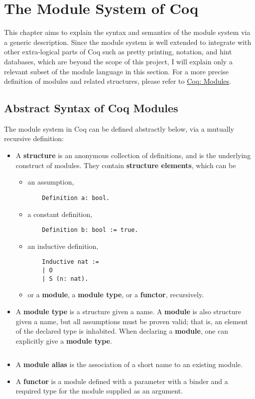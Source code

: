 \chapter{The Module System of Coq}

This chapter aims to explain the syntax and semantics of the module system via
a generic description. Since the module system is well extended to integrate
with other extra-logical parts of Coq such as pretty printing, notation, and 
hint databases, which are beyond the scope of this project, I will
explain only a relevant subset of the module language in this section.
For a more precise definition of modules and related structures, please refer to
\href{https://coq.inria.fr/refman/language/core/modules.html}{Coq: Modules}.

\section{Abstract Syntax of Coq Modules}
The module system in Coq can be defined abstractly below, via a mutually
recursive definition:
\begin{itemize}
\item A \textbf{structure} is an anonymous collection of definitions, and is the 
    underlying construct of modules. They contain \textbf{structure elements},
    which can be
    \begin{itemize}
    \item an assumption,
    \begin{verbatim}
    Definition a: bool.
    \end{verbatim}
    \item a constant definition,
    \begin{verbatim}
    Definition b: bool := true.
    \end{verbatim}
    \item an inductive definition,
    \begin{verbatim}
    Inductive nat :=
    | O
    | S (n: nat).
    \end{verbatim}
    \item or a \textbf{module}, a \textbf{module type}, or a \textbf{functor}, recursively.
    \end{itemize}

\item
    A \textbf{module type} is a structure given a name.
    A \textbf{module} is also structure given a name, but all assumptions must
      be proven valid; that is, an element of the declared type is inhabited.
    When declaring a \textbf{module}, one can explicitly give a \textbf{module type}.
    \inputminted[firstline=11,lastline=22]{coq}{code/module_example.v}
\item A \textbf{module alias} is the association of a short name to an existing
    module.
\item A \textbf{functor} is a module defined with a parameter with a binder and
    a required type for the module supplied as an argument.
\end{itemize}




